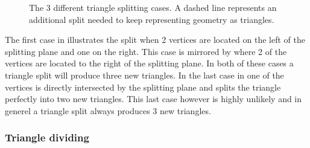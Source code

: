 \begin{figure}
  \centering
  \hspace{5mm}
  \hspace{5mm}

  \vspace{3mm}
  \parbox{10cm}{\caption{The 3 different triangle splitting cases. A dashed line
      represents an additional split needed to keep representing
      geometry as triangles.}\label{fig:splittingCases}}
\end{figure}

The first case in  illustrates the split
when 2 vertices are located on the left of the splitting plane and one
on the right. This case is mirrored by 
where 2 of the vertices are located to the right of the splitting
plane. In both of these cases a triangle split will produce three new
triangles. In the last case in  one of the
vertices is directly intersected by the splitting plane and splits the
triangle perfectly into two new triangles. This last case however is
highly unlikely and in generel a triangle split always produces 3 new
triangles. 


\subsubsection{Triangle dividing}

